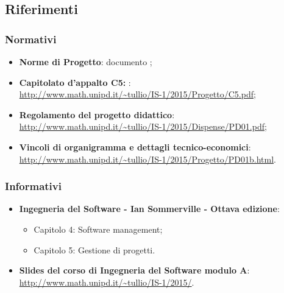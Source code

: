 \subsection{Riferimenti}
\subsubsection{Normativi}
	\begin{itemize}
		\item \textbf{Norme di Progetto}: documento \textit{\NdP};
		\item \textbf{Capitolato d'appalto C5: \progetto}:\\
		\url{http://www.math.unipd.it/~tullio/IS-1/2015/Progetto/C5.pdf};
		\item \textbf{Regolamento del progetto didattico}:\\
		\url{http://www.math.unipd.it/~tullio/IS-1/2015/Dispense/PD01.pdf};
		\item \textbf{Vincoli di organigramma e dettagli tecnico-economici}:\\
		\url{http://www.math.unipd.it/~tullio/IS-1/2015/Progetto/PD01b.html}.
	\end{itemize}
\subsubsection{Informativi}
	\begin{itemize}
		\item \textbf{Ingegneria del Software - Ian Sommerville - Ottava edizione}:
		\begin{itemize}
			\item Capitolo 4: Software management;
			\item Capitolo 5: Gestione di progetti.
		\end{itemize}
		\item \textbf{Slides del corso di Ingegneria del Software modulo A}:\\
		\url{http://www.math.unipd.it/~tullio/IS-1/2015/}.
	\end{itemize}
